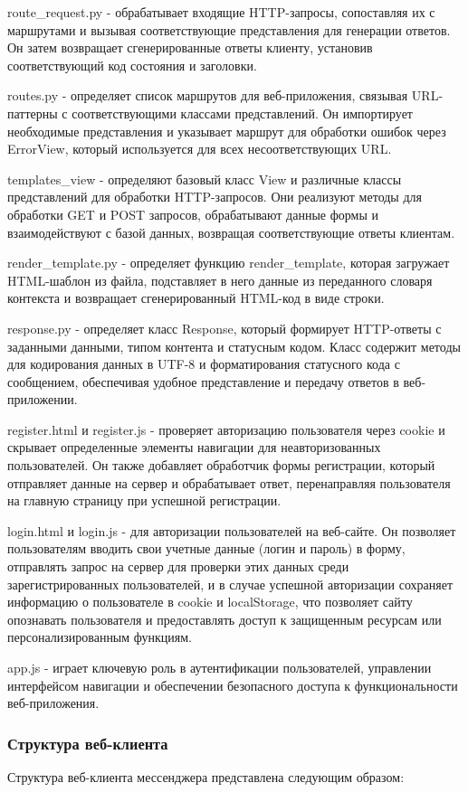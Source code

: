 route\_request.py - обрабатывает входящие HTTP-запросы, сопоставляя их с маршрутами и вызывая соответствующие представления для генерации ответов. Он затем возвращает сгенерированные ответы клиенту, установив соответствующий код состояния и заголовки.

routes.py - определяет список маршрутов для веб-приложения, связывая URL-паттерны с соответствующими классами представлений. Он импортирует необходимые представления и указывает маршрут для обработки ошибок через ErrorView, который используется для всех несоответствующих URL.

templates\_view - определяют базовый класс View и различные классы представлений для обработки HTTP-запросов. Они реализуют методы для обработки GET и POST запросов, обрабатывают данные формы и взаимодействуют с базой данных, возвращая соответствующие ответы клиентам.

render\_template.py - определяет функцию render\_template, которая загружает HTML-шаблон из файла, подставляет в него данные из переданного словаря контекста и возвращает сгенерированный HTML-код в виде строки.

response.py - определяет класс Response, который формирует HTTP-ответы с заданными данными, типом контента и статусным кодом. Класс содержит методы для кодирования данных в UTF-8 и форматирования статусного кода с сообщением, обеспечивая удобное представление и передачу ответов в веб-приложении.

register.html и register.js - проверяет авторизацию пользователя через cookie и скрывает определенные элементы навигации для неавторизованных пользователей. Он также добавляет обработчик формы регистрации, который отправляет данные на сервер и обрабатывает ответ, перенаправляя пользователя на главную страницу при успешной регистрации.

login.html и login.js - для авторизации пользователей на веб-сайте. Он позволяет пользователям вводить свои учетные данные (логин и пароль) в форму, отправлять запрос на сервер для проверки этих данных среди зарегистрированных пользователей, и в случае успешной авторизации сохраняет информацию о пользователе в cookie и localStorage, что позволяет сайту опознавать пользователя и предоставлять доступ к защищенным ресурсам или персонализированным функциям.

app.js - играет ключевую роль в аутентификации пользователей, управлении интерфейсом навигации и обеспечении безопасного доступа к функциональности веб-приложения.


\subsubsection{Структура веб-клиента}
Структура веб-клиента мессенджера представлена следующим образом:

